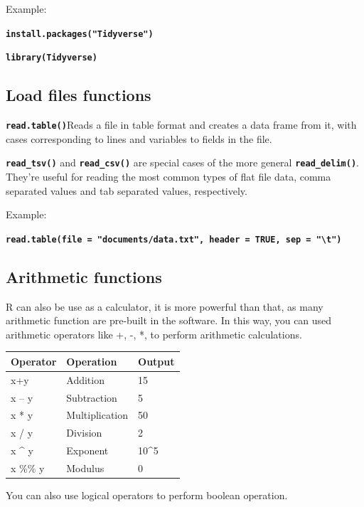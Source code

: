 \documentclass[
  letterpaper,
  DIV=11,
  numbers=noendperiod]{scrartcl}
\begin{document}
Example:

\textbf{\texttt{install.packages("Tidyverse")}}

\textbf{\texttt{library(Tidyverse)}}

\hypertarget{load-files-functions}{%
\subsection{Load files functions}\label{load-files-functions}}

\textbf{\texttt{read.table()}}Reads a file in table format and creates a
data frame from it, with cases corresponding to lines and variables to
fields in the file.

\textbf{\texttt{read\_tsv()}} and \textbf{\texttt{read\_csv()}} are
special cases of the more general \textbf{\texttt{read\_delim()}}.
They're useful for reading the most common types of flat file data,
comma separated values and tab separated values, respectively.

Example:

\textbf{\texttt{read.table(file\ =\ "documents/data.txt",\ header\ =\ TRUE,\ sep\ =\ "\textbackslash{}t")}}

\hypertarget{arithmetic-functions}{%
\subsection{Arithmetic functions}\label{arithmetic-functions}}

R can also be use as a calculator, it is more powerful than that, as
many arithmetic function are pre-built in the software. In this way, you
can used arithmetic operators like +, -, *, to perform arithmetic
calculations.

\begin{longtable}[]{@{}lll@{}}
\toprule\noalign{}
\textbf{Operator} & \textbf{Operation} & \textbf{Output} \\
\midrule\noalign{}
\endhead
\bottomrule\noalign{}
\endlastfoot
x+y & Addition & 15 \\
x -- y & Subtraction & 5 \\
x * y & Multiplication & 50 \\
x / y & Division & 2 \\
x \^{} y & Exponent & 10\^{}5 \\
x \%\% y & Modulus & 0 \\
\end{longtable}

You can also use logical operators to perform boolean operation.
\end{document}
